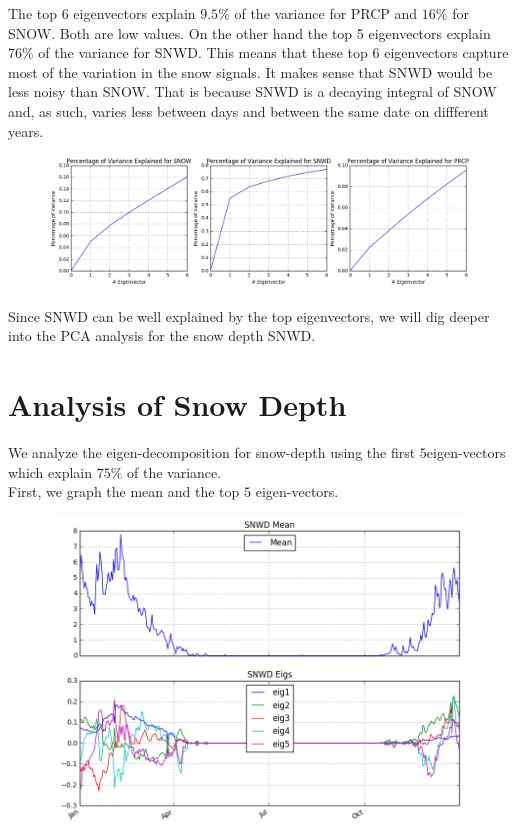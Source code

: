 \documentclass{article}
\begin{document}
The top $6$ eigenvectors explain $9.5\%$ of the variance for PRCP and $16\%$ for SNOW. Both are low values. On the other hand the top 5 eigenvectors explain $76\%$ of the variance for SNWD. This means that these top $6$ eigenvectors capture most of the variation in the snow signals. It makes sense that SNWD would be less noisy than SNOW. That is because SNWD is a decaying integral of SNOW and, as such, varies less between days and between the same date on diffferent years. \\

\begin{figure}[H]
\centering
\includegraphics[width=15cm]{../figures/2_2_pca_snow_explain}
\end{figure}

Since SNWD can be well explained by the top eigenvectors, we will dig deeper into the PCA analysis for the snow depth SNWD.%

\section*{Analysis of Snow Depth}
We analyze the eigen-decomposition for snow-depth using the first $5$eigen-vectors which explain $75\%$ of the variance. \\

First, we graph the mean and the top $5$ eigen-vectors.

\begin{figure}[H]
\centering
\includegraphics[width=15cm,height=8.17cm]{../figures/3_1_mean_eigen_vector}
\end{figure}
\end{document}
